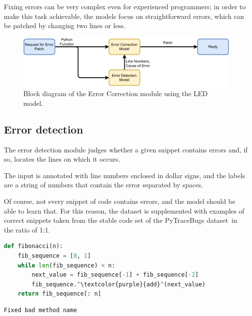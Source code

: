         Fixing errors can be very complex even for experienced programmers; in order to make this task achievable, the models focus on straightforward errors, which can be patched by changing two lines or less.
        
    \begin{figure}[H]
      \centering
      \includegraphics[width=1\textwidth]{obrazky-figures/error correction led.pdf}
       \caption{Block diagram of the Error Correction module using the LED model.}
      \label{fig:error-correction-led}
    \end{figure}
    
    \subsection{Error detection}
        The error detection module judges whether a given snippet contains errors and, if so, locates the lines on which it occurs.
        
        The input is annotated with line numbers enclosed in dollar signs, and the labels are a string of numbers that contain the error separated by spaces.
        
        Of course, not every snippet of code contains errors, and the model should be able to learn that. For this reason, the dataset is supplemented with examples of correct snippets taken from the stable code set of the PyTraceBugs dataset\,\cite{pytracebugs} in the ratio of 1:1.
        
            \begin{lstlisting}[language=Python, label={lst:error}, caption={Example of a code snippet with an error. There should be \texttt{append} instead of \texttt{add} as highlighted in red.}]
def fibonacci(n):
    fib_sequence = [0, 1]
    while len(fib_sequence) < n:
        next_value = fib_sequence[-1] + fib_sequence[-2]
        fib_sequence.^\textcolor{purple}{add}^(next_value)
    return fib_sequence[: n]
            \end{lstlisting}
            
                \medskip
            \begin{lstlisting}[caption={Error description}]
Fixed bad method name\end{lstlisting}

